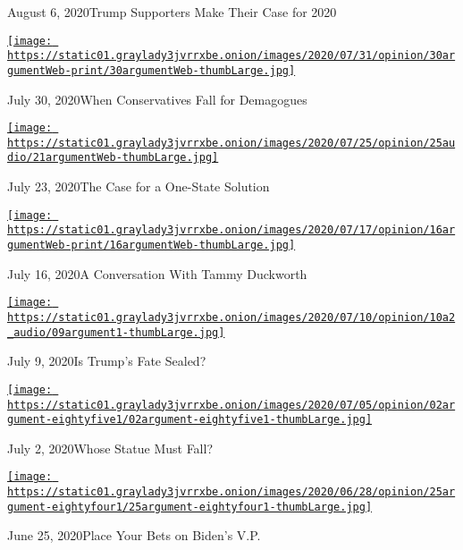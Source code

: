 August 6, 2020Trump Supporters Make Their Case for 2020

\href{https://www.nytimes3xbfgragh.onion/2020/07/30/opinion/the-argument-authoritarianism-anne-applebaum.html?action=click\&module=audio-series-bar\&region=header\&pgtype=Article}{\texttt{[image: https://static01.graylady3jvrrxbe.onion/images/2020/07/31/opinion/30argumentWeb-print/30argumentWeb-thumbLarge.jpg]}}

July 30, 2020When Conservatives Fall for Demagogues

\href{https://www.nytimes3xbfgragh.onion/2020/07/23/opinion/the-argument-israel-palestinian.html?action=click\&module=audio-series-bar\&region=header\&pgtype=Article}{\texttt{[image: https://static01.graylady3jvrrxbe.onion/images/2020/07/25/opinion/25audio/21argumentWeb-thumbLarge.jpg]}}

July 23, 2020The Case for a One-State Solution

\href{https://www.nytimes3xbfgragh.onion/2020/07/16/opinion/the-argument-tammy-duckworth.html?action=click\&module=audio-series-bar\&region=header\&pgtype=Article}{\texttt{[image: https://static01.graylady3jvrrxbe.onion/images/2020/07/17/opinion/16argumentWeb-print/16argumentWeb-thumbLarge.jpg]}}

July 16, 2020A Conversation With Tammy Duckworth

\href{https://www.nytimes3xbfgragh.onion/2020/07/09/opinion/is-trumps-fate-sealed.html?action=click\&module=audio-series-bar\&region=header\&pgtype=Article}{\texttt{[image: https://static01.graylady3jvrrxbe.onion/images/2020/07/10/opinion/10a2\_audio/09argument1-thumbLarge.jpg]}}

July 9, 2020Is Trump's Fate Sealed?

\href{https://www.nytimes3xbfgragh.onion/2020/07/02/opinion/the-argument-protest-statue-revolution.html?action=click\&module=audio-series-bar\&region=header\&pgtype=Article}{\texttt{[image: https://static01.graylady3jvrrxbe.onion/images/2020/07/05/opinion/02argument-eightyfive1/02argument-eightyfive1-thumbLarge.jpg]}}

July 2, 2020Whose Statue Must Fall?

\href{https://www.nytimes3xbfgragh.onion/2020/06/25/opinion/the-argument-biden-vice-president-supreme-court.html?action=click\&module=audio-series-bar\&region=header\&pgtype=Article}{\texttt{[image: https://static01.graylady3jvrrxbe.onion/images/2020/06/28/opinion/25argument-eightyfour1/25argument-eightyfour1-thumbLarge.jpg]}}

June 25, 2020Place Your Bets on Biden's V.P.

